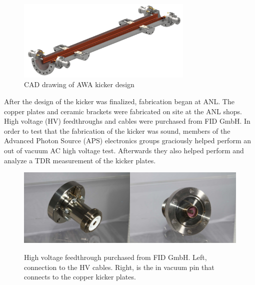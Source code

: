 \begin{figure}%
	\begin{center}
		\includegraphics[width=0.75\textwidth]{./images/kicker}\caption{CAD drawing of AWA kicker design }
		\label{fig:AWAkicker}
	\end{center}
\end{figure}
After the design of the kicker was finalized, fabrication began at ANL.
The copper plates and ceramic brackets were fabricated on site at the ANL shops.
High voltage (HV) feedthroughs and cables were purchased from FID GmbH. 
In order to test that the fabrication of the kicker was sound, members of the 
Advanced Photon Source (APS) electronics groups graciously helped perform an 
out of vacuum AC high voltage test. Afterwards they also helped perform and 
analyze a TDR measurement of the kicker plates.
\begin{figure}%
	\begin{center}
		\includegraphics[width=0.5\textwidth]{./images/FID_feedthrough1}\includegraphics[width=0.5\textwidth]{./images/FID_feedthrough2}
		\caption{High voltage feedthrough purchased from FID GmbH. Left, connection to the HV cables.
		Right, is the in vacuum pin that connects to the copper kicker plates.}
		\label{fig:feedthroughs}
	\end{center}
\end{figure}


